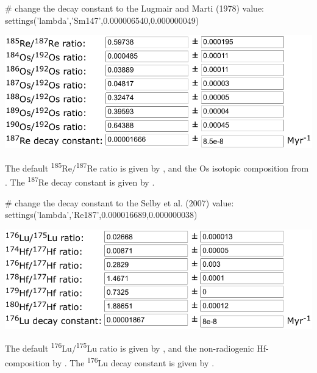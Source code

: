 \begin{refsection}
\begin{script}
# change the decay constant to the Lugmair and Marti (1978) value:
settings('lambda','Sm147',0.000006540,0.000000049)
\end{script}

\noindent\begin{minipage}[t]{.6\linewidth}
\strut\vspace*{-\baselineskip}\newline
\includegraphics[width=\linewidth]{../figures/ReOsLambda.png}
\end{minipage}
\begin{minipage}[t]{.4\linewidth}
The default \textsuperscript{185}Re/\textsuperscript{187}Re ratio is
given by \citet{gramlich1973}, and the Os isotopic composition from
\citet{volkening1991}. The \textsuperscript{187}Re decay constant is
given by \citet{smoliar1996}.\\
\end{minipage}

\begin{script}
# change the decay constant to the Selby et al. (2007) value:
settings('lambda','Re187',0.000016689,0.000000038)
\end{script}

\noindent\begin{minipage}[t]{.6\linewidth}
\strut\vspace*{-\baselineskip}\newline
\includegraphics[width=\linewidth]{../figures/LuHfLambda.png}
\end{minipage}
\begin{minipage}[t]{.4\linewidth}
The default \textsuperscript{176}Lu/\textsuperscript{175}Lu ratio is
given by \citet{delaeter2006}, and the non-radiogenic Hf-composition
by \citet{patchett1983}. The \textsuperscript{176}Lu decay constant is
given by \citet{soderlund2004}.
\end{minipage}


\end{refsection}
